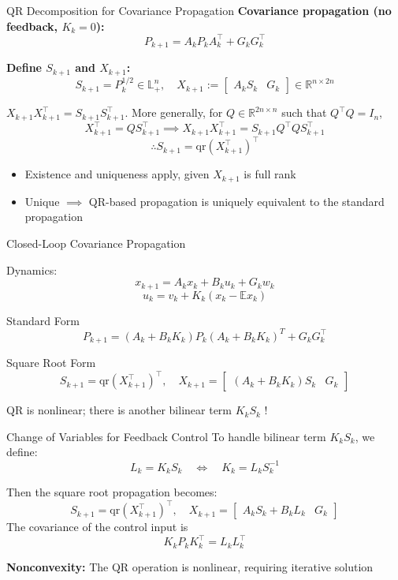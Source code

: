\documentclass{beamer}
\newcommand{\E}{\mathbb{E}}
\begin{document}
\begin{frame}{QR Decomposition for Covariance Propagation}
\textbf{Covariance propagation (no feedback, $K_k = 0$):}
\[
P_{k+1} = A_k P_k A_k^\top + G_k G_k^\top
\]

\textbf{Define $S_{k+1}$ and $X_{k+1}$:}
\[
S_{k+1} = P_k^{1/2} \in \mathbb{L}_+^n, \quad
X_{k+1} := \begin{bmatrix} A_k S_k & G_k \end{bmatrix} \in \mathbb{R}^{n \times 2n}
\]

$X_{k+1} X_{k+1}^\top = S_{k+1} S_{k+1}^\top$.
More generally, for $Q \in \mathbb{R}^{2n \times n}$ such that $Q^\top Q = I_n$,
\[
X_{k+1}^\top = Q S_{k+1}^\top \implies X_{k+1} X_{k+1}^\top = S_{k+1} Q^\top Q S_{k+1}^\top
\]
\[
\therefore S_{k+1} = \mathrm{qr}(X_{k+1}^\top)^\top
\]

\begin{itemize} 
    \item Existence and uniqueness apply, given $X_{k+1}$ is full rank
    \item Unique $\implies$ QR-based propagation is uniquely equivalent to the standard propagation
\end{itemize}
\end{frame}

\begin{frame}{Closed-Loop Covariance Propagation}
\begin{block}{Dynamics:}
\[
x_{k+1} = A_k x_k + B_k u_k + G_k w_k
\]
\[
u_k = v_k + K_k (x_k - \E{x_k})
\]
\end{block}
\begin{block}{Standard Form}
\[
P_{k+1} = (A_k + B_k K_k) P_k (A_k + B_k K_k)^T + G_k G_k^\top
\]
\end{block}

\begin{block}{Square Root Form}
\[
S_{k+1} = \mathrm{qr}(X_{k+1}^\top)^\top, \quad X_{k+1} = \begin{bmatrix} (A_k + B_k K_k) S_k & G_k \end{bmatrix}
\]
\end{block}
QR is nonlinear; there is another bilinear term $K_k S_k$ !
\end{frame}

\begin{frame}{Change of Variables for Feedback Control}
To handle bilinear term $K_k S_k$, we define:
\[
L_k = K_k S_k \quad \iff \quad K_k = L_k S_k^{-1}
\]

Then the square root propagation becomes:
\[
S_{k+1} = \mathrm{qr}(X_{k+1}^\top)^\top, \quad X_{k+1} = \begin{bmatrix} A_k S_k + B_k L_k & G_k \end{bmatrix}
\]
The covariance of the control input is 
\[
K_k P_k K_k^\top = L_k L_k^\top
\]

\textbf{Nonconvexity:} The QR operation is nonlinear, requiring iterative solution
\end{frame}
\end{document}
